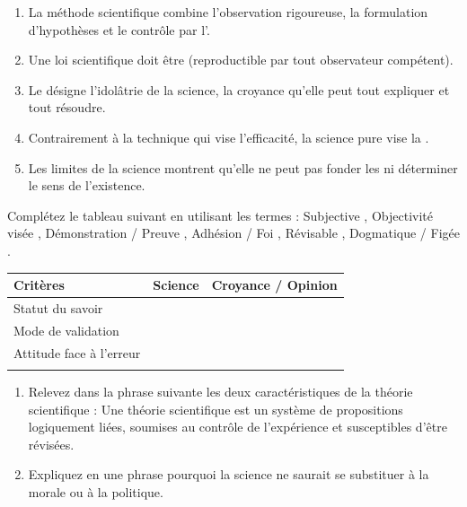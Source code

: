 \documentclass[11pt]{article}
\begin{document}
\begin{exercice}
\begin{enumerate}
    \item La méthode scientifique combine l'observation rigoureuse, la formulation d'hypothèses et le contrôle par l'\underline{\hspace{4cm}}.
    \item Une loi scientifique doit être \underline{\hspace{4cm}} (reproductible par tout observateur compétent).
    \item Le \underline{\hspace{4cm}} désigne l'idolâtrie de la science, la croyance qu'elle peut tout expliquer et tout résoudre.
    \item Contrairement à la technique qui vise l'efficacité, la science pure vise la \underline{\hspace{4cm}}.
    \item Les limites de la science montrent qu'elle ne peut pas fonder les \underline{\hspace{4cm}} ni déterminer le sens de l'existence.
\end{enumerate}
\end{exercice}

\begin{exercice}
Complétez le tableau suivant en utilisant les termes : \og Subjective \fg, \og Objectivité visée \fg, \og Démonstration / Preuve \fg, \og Adhésion / Foi \fg, \og Révisable \fg, \og Dogmatique / Figée \fg.

\begin{tabular}{|l|c|c|}
\hline
\textbf{Critères} & \textbf{Science} & \textbf{Croyance / Opinion} \\
\hline
Statut du savoir &  &  \\
\hline
Mode de validation &  &  \\
\hline
Attitude face à l'erreur &  &  \\
\hline
\multicolumn{3}{c}{} \\
\hline
\end{tabular}
\end{exercice}

\begin{exercice}
\begin{enumerate}
    \item Relevez dans la phrase suivante les deux caractéristiques de la théorie scientifique : \og Une théorie scientifique est un système de propositions logiquement liées, soumises au contrôle de l'expérience et susceptibles d'être révisées. \fg
    \item Expliquez en une phrase pourquoi la science ne saurait se substituer à la morale ou à la politique.
\end{enumerate}
\end{exercice}
\end{document}
